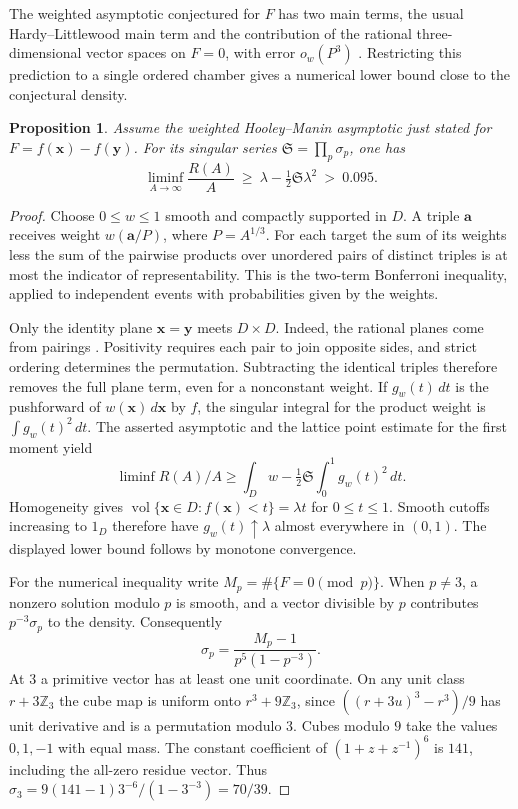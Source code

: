 \documentclass[11pt,letterpaper]{article}
\newtheorem{proposition}[proposition]{Proposition}
\theoremstyle{definition}
\begin{document}
The weighted asymptotic conjectured for $F$ has two main terms, the usual
Hardy--Littlewood main term and the contribution of the rational
three-dimensional vector spaces on $F=0$, with error $o_w(P^3)$
\cite[(1.2)--(1.3)]{c3:wang}. Restricting this prediction to a single
ordered chamber gives a numerical lower bound close to the conjectural density.

\begin{proposition}\label{c3:quant}
Assume the weighted Hooley--Manin asymptotic just stated for
$F=f(\mathbf{x})-f(\mathbf{y})$. For its singular series
$\mathfrak S=\prod_p\sigma_p$, one has
\[
 \liminf_{A\to\infty}\frac{R(A)}{A}
 \ \ge\ \lambda-\tfrac12\mathfrak S\lambda^2\ >\ 0.095.
\]
\end{proposition}

\begin{proof}
Choose $0\le w\le1$ smooth and compactly supported in $D$. A triple
$\mathbf a$ receives weight $w(\mathbf a/P)$, where $P=A^{1/3}$.
For each target the sum of its weights less the sum of the pairwise
products over unordered pairs of distinct triples is at most the indicator
of representability. This is the two-term Bonferroni inequality, applied
to independent events with probabilities given by the weights.

Only the identity plane $\mathbf x=\mathbf y$ meets $D\times D$.
Indeed, the rational planes come from pairings
\cite[Proposition 3.6]{c3:planes}. Positivity requires each pair to join
opposite sides, and strict ordering determines the permutation. Subtracting
the identical triples therefore removes the full plane term, even for a
nonconstant weight. If $g_w(t)\,dt$ is the pushforward of
$w(\mathbf x)\,d\mathbf x$ by $f$, the singular integral for the product
weight is $\int g_w(t)^2\,dt$. The asserted asymptotic and the lattice
point estimate for the first moment yield
\[
 \liminf R(A)/A\ge \int_D w-\tfrac12\mathfrak S\int_0^1g_w(t)^2\,dt.
\]
Homogeneity gives $\operatorname{vol}\{\mathbf x\in D:f(\mathbf x)<t\}
=\lambda t$ for $0\le t\le1$. Smooth cutoffs increasing to $1_D$
therefore have $g_w(t)\uparrow\lambda$ almost everywhere in $(0,1)$.
The displayed lower bound follows by monotone convergence.

For the numerical inequality write $M_p=\#\{F=0\pmod p\}$. When $p\ne3$,
a nonzero solution modulo $p$ is smooth, and a vector divisible by $p$
contributes $p^{-3}\sigma_p$ to the density. Consequently
\[
 \sigma_p=\frac{M_p-1}{p^5(1-p^{-3})}.
\]
At $3$ a primitive vector has at least one unit coordinate. On any unit
class $r+3\mathbb Z_3$ the cube map is uniform onto $r^3+9\mathbb Z_3$,
since $( (r+3u)^3-r^3)/9$ has unit derivative and is a permutation
modulo $3$. Cubes modulo $9$ take the values $0,1,-1$ with equal mass.
The constant coefficient of $(1+z+z^{-1})^6$ is $141$, including the
all-zero residue vector. Thus
$\sigma_3=9(141-1)3^{-6}/(1-3^{-3})=70/39$.


\end{proof}
\end{document}
